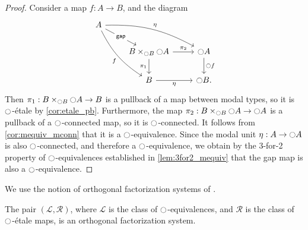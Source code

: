 \documentclass[9pt,twosided]{amsart}
\begin{document}
\begin{proof}
Consider a map $f:A\to B$, and the diagram
\begin{equation*}
\begin{tikzcd}
A \arrow[ddr,bend right=15,swap,"f"] \arrow[drr,bend left=15,"\modalunit"] \arrow[dr,"\mathsf{gap}" description] \\
& B\times_{\modal B} \modal A \arrow[d,swap,"\pi_1"] \arrow[r,"\pi_2"] & \modal A \arrow[d,"\modal f"] \\
& B \arrow[r,swap,"\modalunit"] & \modal B.
\end{tikzcd}
\end{equation*}
Then $\pi_1:B\times_{{\ocircle} B} {\ocircle} A\to B$ is a pullback of a map between modal types, so it is ${\ocircle}$-\'etale by \cref{cor:etale_pb}. Furthermore, the map $\pi_2:B\times_{{\ocircle} B}{\ocircle} A\to {\ensuremath{\ocircle}} A$ is a pullback of a ${\ocircle}$-connected map, so it is ${\ocircle}$-connected. It follows from \cref{cor:mequiv_mconn} that it is a ${\ocircle}$-equivalence. Since the modal unit ${\eta_{}} :A\to{\ensuremath{\ocircle}} A$ is also ${\ocircle}$-connected, and therefore a ${\ocircle}$-equivalence, we obtain by the 3-for-2 property of ${\ocircle}$-equivalences established in \cref{lem:3for2_mequiv} that the gap map is also a ${\ocircle}$-equivalence.
\end{proof}

We use the notion of orthogonal factorization systems of \cite{RijkeShulmanSpitters}.

\begin{thm}\label{lem:rfs_orthogonal}
  The pair $(\mathcal{L},\mathcal{R})$, where $\mathcal{L}$ is the class of ${\ocircle}$-equivalences, and $\mathcal{R}$ is the class of ${\ocircle}$-\'etale maps, is an orthogonal factorization system.
\end{thm}
\end{document}
